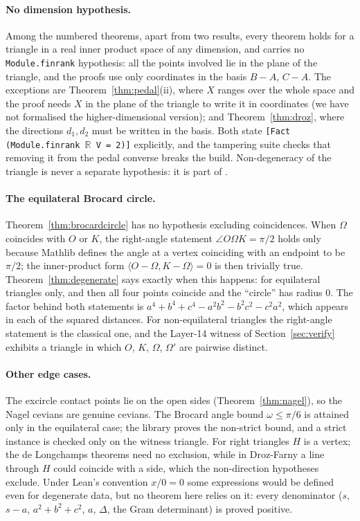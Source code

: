\documentclass[11pt]{article}
\theoremstyle{definition}
\theoremstyle{remark}
\newcommand{\lean}[1]{\texttt{#1}}
\begin{document}
\paragraph{No dimension hypothesis.} Among the numbered theorems, apart from two results, every theorem holds for a triangle in a
real inner product space of any dimension, and carries no \lean{Module.finrank} hypothesis: all the
points involved lie in the plane of the triangle, and the proofs use only coordinates in the basis
$B-A$, $C-A$. The exceptions are Theorem~\ref{thm:pedal}(ii), where $X$ ranges over the whole space
and the proof needs $X$ in the plane of the triangle to write it in coordinates (we have not
formalised the higher-dimensional version); and Theorem~\ref{thm:droz}, where the
directions $d_1,d_2$ must be written in the basis. Both state \lean{[Fact (Module.finrank \(\mathbb{R}\) V = 2)]}
explicitly, and the tampering suite checks that removing it from the pedal converse breaks the build.
Non-degeneracy of the triangle is never a separate hypothesis: it is part of
.

\paragraph{The equilateral Brocard circle.} Theorem~\ref{thm:brocardcircle} has no hypothesis
excluding coincidences. When $\Omega$ coincides with $O$ or $K$, the right-angle statement
$\angle O\Omega K=\pi/2$ holds only because Mathlib defines the angle at a vertex coinciding with an
endpoint to be $\pi/2$; the inner-product form $\langle O-\Omega,K-\Omega\rangle=0$ is then trivially
true. Theorem~\ref{thm:degenerate} says exactly when this happens: for equilateral triangles only, and
then all four points coincide and the ``circle'' has radius $0$. The factor behind both statements
is $a^4+b^4+c^4-a^2b^2-b^2c^2-c^2a^2$, which appears in each of the squared distances. For
non-equilateral triangles the right-angle statement is the classical one, and the Layer-14 witness of
Section~\ref{sec:verify} exhibits a triangle in which $O$, $K$, $\Omega$, $\Omega'$ are pairwise
distinct.

\paragraph{Other edge cases.} The excircle contact points lie on the open sides
(Theorem~\ref{thm:nagel}), so the Nagel cevians are genuine cevians. The Brocard angle bound
$\omega\le\pi/6$ is attained only in the equilateral case; the library proves the non-strict bound,
and a strict instance is checked only on the witness triangle. For right triangles $H$ is a vertex;
the de Longchamps theorems need no exclusion, while in Droz-Farny a line through $H$ could coincide
with a side, which the non-direction hypotheses exclude. Under Lean's convention $x/0=0$ some
expressions would be defined even for degenerate data, but no theorem here relies on it: every
denominator ($s$, $s-a$, $a^2+b^2+c^2$, $a$, $\Delta$, the Gram determinant) is proved positive.
\end{document}
